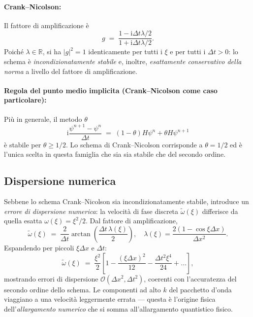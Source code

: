 \documentclass[12pt, a4paper]{article}
\newcommand{\dt}{\Delta t}
\newcommand{\dx}{\Delta x}
\newcommand{\ii}{\mathrm{i}}          %
\newcommand{\CN}{Crank--Nicolson}
\begin{document}
\paragraph{Crank--Nicolson:}
Il fattore di amplificazione è
\begin{equation}
  g \;=\; \frac{1 - \ii\dt\lambda/2}{1 + \ii\dt\lambda/2}.
\end{equation}
Poiché $\lambda \in \mathbb{R}$, si ha $|g|^2 = 1$ identicamente
per tutti i $\xi$ e per tutti i $\dt > 0$: lo schema è
\emph{incondizionatamente stabile} e, inoltre, \emph{esattamente
conservativo della norma} a livello del fattore di amplificazione.

\paragraph{Regola del punto medio implicita (\CN{} come caso particolare):}
Più in generale, il metodo $\theta$
\begin{equation}
  \ii\frac{\psi^{n+1}-\psi^n}{\dt} \;=\;
  (1-\theta)H\psi^n + \theta H\psi^{n+1}
\end{equation}
è stabile per $\theta \geq 1/2$.  Lo schema di \CN{} corrisponde
a $\theta = 1/2$ ed è l'unica scelta in questa famiglia che sia sia
stabile che del secondo ordine.

\subsection{Dispersione numerica}

Sebbene lo schema \CN{} sia incondizionatamente stabile, introduce
un \emph{errore di dispersione numerica}: la velocità di fase discreta
$\tilde{\omega}(\xi)$ differisce da quella esatta
$\omega(\xi) = \xi^2/2$.  Dal fattore di amplificazione,
\begin{equation}
  \tilde{\omega}(\xi) \;=\;
  \frac{2}{\dt}\arctan\!\left(\frac{\dt\,\lambda(\xi)}{2}\right),
  \quad
  \lambda(\xi) = \frac{2(1-\cos\xi\dx)}{\dx^2}.
\end{equation}
Espandendo per piccoli $\xi\dx$ e $\dt$:
\begin{equation}
  \tilde{\omega}(\xi) \;=\; \frac{\xi^2}{2}
  \left[1 - \frac{(\xi\dx)^2}{12} - \frac{\dt^2\xi^4}{24} + \ldots\right],
\end{equation}
mostrando errori di dispersione $\mathcal{O}(\dx^2, \dt^2)$, coerenti
con l'accuratezza del secondo ordine dello schema.  Le componenti ad
alto $k$ del pacchetto d'onda viaggiano a una velocità leggermente
errata --- questa è l'origine fisica dell'\emph{allargamento numerico}
che si somma all'allargamento quantistico fisico.
\end{document}
